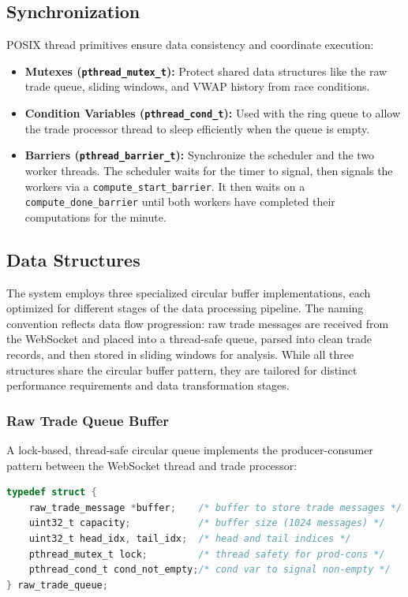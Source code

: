 \documentclass[12pt,a4paper]{article}
\begin{document}
\subsection{Synchronization}

POSIX thread primitives ensure data consistency and coordinate execution:

\begin{itemize}
    \item \textbf{Mutexes (\texttt{pthread\_mutex\_t}):} Protect shared data structures like the raw trade queue, sliding windows, and VWAP history from race conditions.
    \item \textbf{Condition Variables (\texttt{pthread\_cond\_t}):} Used with the ring queue to allow the trade processor thread to sleep efficiently when the queue is empty.
    \item \textbf{Barriers (\texttt{pthread\_barrier\_t}):} Synchronize the scheduler and the two worker threads. The scheduler waits for the timer to signal, then signals the workers via a \texttt{compute\_start\_barrier}. It then waits on a \texttt{compute\_done\_barrier} until both workers have completed their computations for the minute.
\end{itemize}

\subsection{Data Structures}

The system employs three specialized circular buffer implementations, each optimized for different stages of the data processing pipeline. The naming convention reflects data flow progression: raw trade messages are received from the WebSocket and placed into a thread-safe queue, parsed into clean trade records, and then stored in sliding windows for analysis. While all three structures share the circular buffer pattern, they are tailored for distinct performance requirements and data transformation stages.

\subsubsection{Raw Trade Queue Buffer}

A lock-based, thread-safe circular queue implements the producer-consumer pattern between the WebSocket thread and trade processor:

\vspace{3mm}

\begin{lstlisting}[language=C, caption=Raw Trade Queue Structure]
typedef struct {
    raw_trade_message *buffer;    /* buffer to store trade messages */
    uint32_t capacity;            /* buffer size (1024 messages) */
    uint32_t head_idx, tail_idx;  /* head and tail indices */
    pthread_mutex_t lock;         /* thread safety for prod-cons */
    pthread_cond_t cond_not_empty;/* cond var to signal non-empty */
} raw_trade_queue;
\end{lstlisting}
\end{document}
